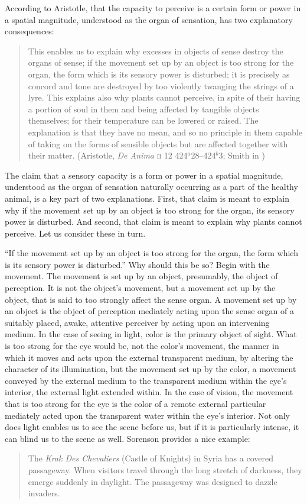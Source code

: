 According to Aristotle, that the capacity to perceive is a certain form or power in a spatial magnitude, understood as the organ of sensation, has two explanatory consequences:
\begin{quote}
	This enables us to explain why excesses in objects of sense destroy the organs of sense; if the movement set up by an object is too strong for the organ, the form which is its sensory power is disturbed; it is precisely as concord and tone are destroyed by too violently twanging the strings of a lyre. This explains also why plants cannot perceive, in spite of their having a portion of soul in them and being affected by tangible objects themselves; for their temperature can be lowered or raised. The explanation is that they have no mean, and so no principle in them capable of taking on the forms of sensible objects but are affected together with their matter. (Aristotle, \emph{De Anima} \textsc{ii} 12 424\( ^{a} \)28--424\( ^{b} \)3; Smith in \citealt[43]{Barnes:1984uq})
\end{quote}
The claim that a sensory capacity is a form or power in a spatial magnitude, understood as the organ of sensation naturally occurring as a part of the healthy animal, is a key part of two explanations. First, that claim is meant to explain why if the movement set up by an object is too strong for the organ, its sensory power is disturbed. And second, that claim is meant to explain why plants cannot perceive. Let us consider these in turn.

``If the movement set up by an object is too strong for the organ, the form which is its sensory power is disturbed.'' Why should this be so? Begin with the movement. The movement is set up by an object, presumably, the object of perception. It is not the object's movement, but a movement set up by the object, that is said to too strongly affect the sense organ. A movement set up by an object is the object of perception mediately acting upon the sense organ of a suitably placed, awake, attentive perceiver by acting upon an intervening medium. In the case of seeing in light, color is the primary object of sight. What is too strong for the eye would be, not the color's movement, the manner in which it moves and acts upon the external transparent medium, by altering the character of its illumination, but the movement set up by the color, a movement conveyed by the external medium to the transparent medium within the eye's interior, the external light extended within. In the case of vision, the movement that is too strong for the eye is the color of a remote external particular mediately acted upon the transparent water within the eye's interior. Not only does light enables us to see the scene before us, but if it is particularly intense, it can blind us to the scene as well. Sorenson provides a nice example:
\begin{quote}
	The \emph{Krak Des Chevaliers} (Castle of Knights) in Syria has a covered passageway. When visitors travel through the long stretch of darkness, they emerge suddenly in daylight. The passageway was designed to dazzle invaders. \citep[6]{Sorensen:2008kx}
\end{quote}

